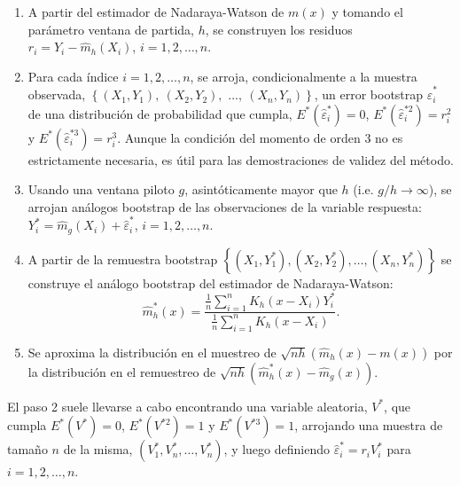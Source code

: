 \documentclass[
]{book}
\theoremstyle{break}
\theoremstyle{nonumberplain}
\begin{document}
\begin{enumerate}
\def\labelenumi{\arabic{enumi}.}
\item
  A partir del estimador de Nadaraya-Watson de \(m\left( x \right)\) y
  tomando el parámetro ventana de partida, \(h\), se construyen los
  residuos
  \(r_i = Y_i - \hat{m}_{h}\left( X_i \right)\),
  \(i=1, 2, \ldots, n\).
\item
  Para cada índice \(i=1,2,\ldots ,n\), se arroja, condicionalmente a la
  muestra observada, \(\left\{ \left( X_1,Y_1 \right), \ \left(
  X_2,Y_2 \right),\right.\)
  \(\left.\ldots ,\ \left( X_n,Y_n \right) \right\}\),
  un error bootstrap \(\hat{\varepsilon}_i^{\ast}\) de una
  distribución de probabilidad que cumpla,
  \(E^{\ast}\left( \hat{\varepsilon}_i^{\ast} \right) =0\),
  \(E^{\ast}\left( \hat{\varepsilon}_i^{\ast 2} \right) =r_i^2\) y
  \(E^{\ast}\left( \hat{\varepsilon}_i^{\ast 3} \right) =r_i^{3}\).
  Aunque la condición del momento de orden 3 no es estrictamente necesaria,
  es útil para las demostraciones de validez del método.
\item
  Usando una ventana piloto \(g\), asintóticamente mayor que \(h\) (i.e.
  \(g/h\rightarrow \infty\)), se arrojan análogos bootstrap de las
  observaciones de la variable respuesta:
  \(Y_i^{\ast}=\hat{m}_{g}\left(X_i \right)
   +\hat{\varepsilon}_i^{\ast}\), \(i=1,2,\ldots ,n\).
\item
  A partir de la remuestra bootstrap \(\left\{ \left( X_1,Y_1^{\ast
  } \right),\left( X_2,Y_2^{\ast} \right),\ldots ,\left(
  X_n,Y_n^{\ast} \right) \right\}\) se construye el análogo
  bootstrap del estimador de Nadaraya-Watson:
  \[\hat{m}_{h}^{\ast}\left( x \right) =\frac{\frac{1}{n}\sum_{i=1}^{n}K_{h}
  \left( x-X_i \right) Y_i^{\ast}}{\frac{1}{n}\sum_{i=1}^{n}K_{h}\left(
  x-X_i \right)}.\]
\item
  Se aproxima la distribución en el muestreo de \(\sqrt{nh}\left(
  \hat{m}_{h}\left( x \right) -m\left( x \right) \right)\) por la
  distribución en el remuestreo de
  \(\sqrt{nh}\left( \hat{m}_{h}^{\ast}\left( x \right) -
  \hat{m}_{g}\left( x \right) \right)\).
\end{enumerate}

El paso 2 suele llevarse a cabo encontrando una variable aleatoria,
\(V^{\ast}\), que cumpla \(E^{\ast}\left( V^{\ast} \right) =0\), \(E^{\ast}\left(
V^{\ast 2} \right) =1\) y \(E^{\ast}\left( V^{\ast 3} \right) =1\),
arrojando una muestra de tamaño \(n\) de la misma,
\(\left( V_1^{\ast},V_n^{\ast},\ldots ,V_n^{\ast} \right)\), y luego
definiendo \(\hat{\varepsilon}_i^{\ast} = r_iV_i^{\ast}\)
para \(i=1, 2, \ldots, n\).
\end{document}

